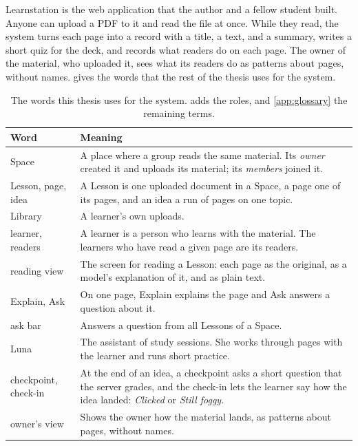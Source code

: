 Learnstation is the web application that the author and a fellow student
built. Anyone can upload a PDF to it and read the file at once. While they
read, the system turns each page into a record with a title, a text, and a
summary, writes a short quiz for the deck, and records what readers do on each
page. The owner of the material, who uploaded it, sees what its readers do as
patterns about pages, without names.  gives the words
that the rest of the thesis uses for the system.

\begin{table}[htbp]
  \centering\small
  \caption{The words this thesis uses for the system. 
    adds the roles, and \cref{app:glossary} the remaining terms.}
  \label{tab:vocabulary}
  \begin{tabular}{@{}p{}p{}@{}}
    \toprule
    \textbf{Word} & \textbf{Meaning} \\
    \midrule
    Space & A place where a group reads the same material. Its \emph{owner}
      created it and uploads its material; its \emph{members} joined it. \\
    Lesson, page, idea & A Lesson is one uploaded document in a Space, a page
      one of its pages, and an idea a run of pages on one topic. \\
    Library & A learner's own uploads. \\
    learner, readers & A learner is a person who learns with the material.
      The learners who have read a given page are its readers. \\
    reading view & The screen for reading a Lesson: each page as the
      original, as a model's explanation of it, and as plain text. \\
    Explain, Ask & On one page, Explain explains the page and Ask answers a
      question about it. \\
    ask bar & Answers a question from all Lessons of a Space. \\
    Luna & The assistant of study sessions. She works through pages with the
      learner and runs short practice. \\
    checkpoint, check-in & At the end of an idea, a checkpoint asks a short
      question that the server grades, and the check-in lets the learner say
      how the idea landed: \emph{Clicked} or \emph{Still foggy}. \\
    owner's view & Shows the owner how the material lands, as patterns about
      pages, without names. \\
    \bottomrule
  \end{tabular}
\end{table}

